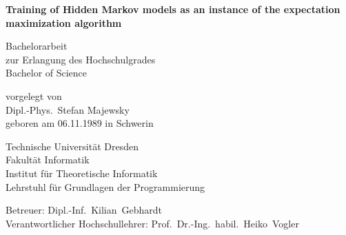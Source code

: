 \documentclass[
 paper=A4,pagesize=automedia,fontsize=11pt,
 BCOR=10mm,DIV=16,
 twoside,headinclude,footinclude=false,
 bibtotocnumbered,          %
 liststotoc,                %
 listsleft,
 pointlessnumbers,          %
 cleardoublepage=empty      %
]{scrbook}
\theoremstyle{definition}
\numberwithin{theorem}{chapter}
\numberwithin{equation}{chapter}
\numberwithin{figure}{chapter}
\numberwithin{table}{chapter}
\begin{document}
\frontmatter

\begin{titlepage}
 \begin{center}
  \vspace*{5em}

  \begin{singlespace}\bfseries\Huge
   Training of Hidden Markov models as an instance of the expectation maximization algorithm
  \end{singlespace}

  \vspace*{5em}

  \begin{singlespace}\large
   Bachelorarbeit \\ zur Erlangung des Hochschulgrades \\ Bachelor of Science
  \end{singlespace}\medskip

  \vspace*{4em}

  vorgelegt von \\
  {\large Dipl.-Phys.~Stefan Majewsky} \\
  geboren am 06.11.1989 in Schwerin

  \vspace*{4em}

  \begin{singlespace}\large
   Technische Universität Dresden \\
   Fakultät Informatik \\
   Institut für Theoretische Informatik \\
   Lehrstuhl für Grundlagen der Programmierung
  \end{singlespace}

  \vspace*{4em}

  \begin{singlespace}
   Betreuer: Dipl.-Inf.~Kilian~Gebhardt \\
   Verantwortlicher Hochschullehrer: Prof.~Dr.-Ing.~habil.~Heiko~Vogler
  \end{singlespace}

 \end{center}


\end{titlepage}
\end{document}
